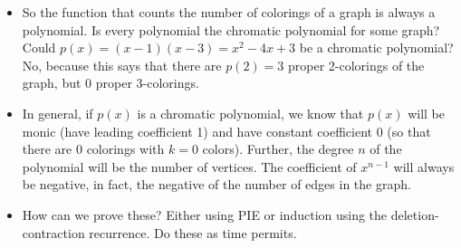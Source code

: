 \documentclass[12pt]{article}
\theoremstyle{plain}
\theoremstyle{definition}
\theoremstyle{remark}
\newcommand{\ex}{\noindent\textbf{Ex:} }
\newcommand{\todayis}[1]{\clearpage{\rhead{\footnotesize #1}}}
\begin{document}
\begin{itemize}
  \item So the function that counts the number of colorings of a graph is always a polynomial.  Is every polynomial the chromatic polynomial for some graph?  Could $p(x) = (x-1)(x-3) = x^2 - 4x + 3$ be a chromatic polynomial?  No, because this says that there are $p(2) = 3$ proper 2-colorings of the graph, but 0 proper 3-colorings.

  \item In general, if $p(x)$ is a chromatic polynomial, we know that $p(x)$ will be monic (have leading coefficient 1) and have constant coefficient 0 (so that there are 0 colorings with $k = 0$ colors).  Further, the degree $n$ of the polynomial will be the number of vertices.  The coefficient of $x^{n-1}$ will always be negative, in fact, the negative of the number of edges in the graph.

  \item How can we prove these?  Either using PIE or induction using the deletion-contraction recurrence.  Do these as time permits. 
\end{itemize}


%
%
%
%
%
%
%
%
%
%
%
%
%
%
%
%
%
%
%
%
\end{document}
